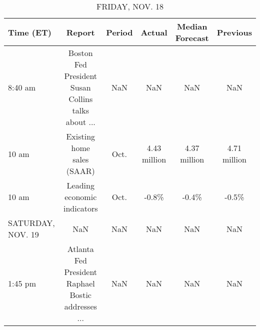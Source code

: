 \documentclass{article}%
\begin{document}
\begin{table}[htbp]%
\caption{FRIDAY, NOV. 18}%
\centering%
\begin{adjustbox}{width=1\textwidth}%
\begin{tabular}{lccccc}
\toprule
        Time (ET) &                                             Report & Period &       Actual & Median Forecast &     Previous \\
\midrule
          8:40 am & Boston Fed President Susan Collins talks about ... &    NaN &          NaN &             NaN &          NaN \\
            10 am &                         Existing home sales (SAAR) &   Oct. & 4.43 million &    4.37 million & 4.71 million \\
            10 am &                        Leading economic indicators &   Oct. &        -0.8\% &           -0.4\% &        -0.5\% \\
SATURDAY, NOV. 19 &                                                NaN &    NaN &          NaN &             NaN &          NaN \\
          1:45 pm & Atlanta Fed President Raphael Bostic addresses ... &    NaN &          NaN &             NaN &          NaN \\
\bottomrule
\end{tabular}
%
\end{adjustbox}%
\end{table}
\end{document}
